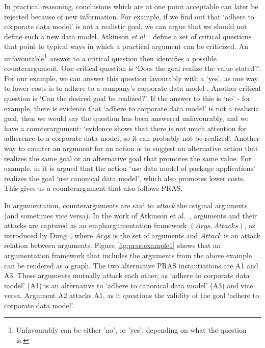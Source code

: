 \documentclass[11.5pt,two column]{llncs}
\begin{document}
In practical reasoning, conclusions which are at one point acceptable can later be rejected because of new information. For example, if we find out that `adhere to corporate data model' is not a realistic goal, we can argue that we should not define such a new data model. Atkinson \emph{et al.}~\cite{atkinson2007} define a set of critical questions that point to typical ways in which a practical argument can be criticized. An unfavourable\footnote{Unfavourably can be either 'no', or 'yes', depending on what the question is.} answer to a critical question then identifies a possible counterargument. One critical question is `Does the goal realize the value stated?'. For our example, we can answer this question favourably with a `yes', as one way to lower costs is to adhere to a company's corporate data model \cite{vanZee-etal:er2016}. Another critical question is `Can the desired goal be realized?'. If the answer to this is `no' - for example, there is evidence that `adhere to corporate data model' is not a realistic goal, then we would say the question has been answered unfavourably, and we have a counterargument: `evidence shows that there is not much attention for adherence to a corporate data model, so it can probably not be realized'. Another way to counter an argument for an action is to suggest an alternative action that realizes the same goal or an alternative goal that promotes the same value. For example, in \cite{vanZee-etal:er2016} it is argued that the action `use data model of package applications' realizes the goal `use canonical data model', which also promotes lower costs. This gives us a counterargument that also follows PRAS. 

In argumentation, counterarguments are said to \emph{attack} the original arguments (and sometimes vice versa). In the work of Atkinson et al.~\cite{atkinson2007}, arguments and their attacks are captured as an emph{argumentation framework} $(Args, Attacks)$, as introduced by Dung~\cite{Dung1995}, where $Args$ is the set of arguments and $Attack$ is an attack relation between arguments. Figure \ref{fig:pras:example1} shows that an argumentation framework that includes the arguments from the above example can be rendered as a graph. The two alternative PRAS instantiations are A1 and A3. These arguments mutually attack each other, as `adhere to corporate data model' (A1) is an alternative to `adhere to canonical data model' (A3) and vice versa. Argument A2 attacks A1, as it questions the validity of the goal `adhere to corporate data model'. 
\end{document}
